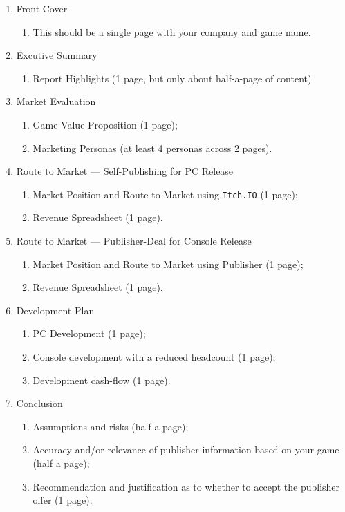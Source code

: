 \documentclass{../../fal_assignment}
\begin{document}
\begin{enumerate}[label=(\alph*)]
\item Front Cover
    	\begin{enumerate}[label=\roman*.]
    		\item This should be a single page with your company and game name.
	\end{enumerate}
\item Excutive Summary
    	\begin{enumerate}[label=\roman*.]
    		\item Report Highlights (1 page, but only about half-a-page of content)
	\end{enumerate}
\item Market Evaluation
    	\begin{enumerate}[label=\roman*.]
    		\item Game Value Proposition (1 page);
    		\item Marketing Personas (at least 4 personas across 2 pages).
    	\end{enumerate}		
\item Route to Market --- Self-Publishing for PC Release	
    	\begin{enumerate}[label=\roman*.]	
    		\item Market Position and Route to Market using \texttt{Itch.IO} (1 page);
    		\item Revenue Spreadsheet (1 page).
	\end{enumerate}
\item Route to Market --- Publisher-Deal for Console Release  
    	\begin{enumerate}[label=\roman*.]	
    		\item Market Position and Route to Market using Publisher (1 page);
    		\item Revenue Spreadsheet (1 page).
	\end{enumerate}	
\item Development Plan
     	\begin{enumerate}[label=\roman*.]	
    		\item PC Development (1 page);
    		\item Console development with a reduced headcount (1 page);
    		\item Development cash-flow (1 page).
	\end{enumerate}		
\item Conclusion	
     	\begin{enumerate}[label=\roman*.]	
    		\item Assumptions and risks (half a page);
    		\item Accuracy and/or relevance of publisher information based on your game (half a page);
    		\item Recommendation and justification as to whether to accept the publisher offer (1 page).
	\end{enumerate}		
\end{enumerate}
\end{document}
